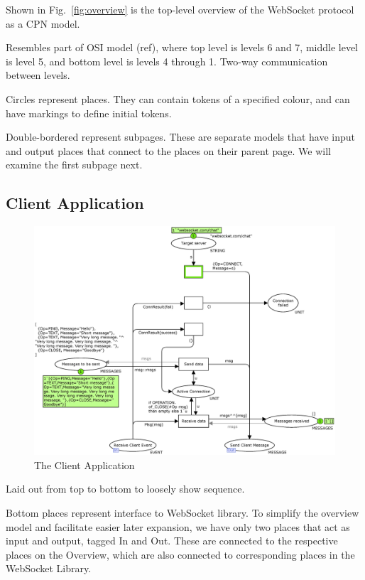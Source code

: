 Shown in Fig.~\ref{fig:overview} is the top-level overview of the WebSocket
protocol as a CPN model. 

Resembles part of OSI model (ref), where top level is levels 6 and 7, middle
level is level 5, and bottom level is levels 4 through 1. Two-way communication
between levels.

Circles represent places. They can contain tokens of a specified colour, and
can have markings to define initial tokens.

Double-bordered represent subpages. These are separate models that have
input and output places that connect to the places on their parent page. We will
examine the first subpage next.

\subsection{Client Application}

\begin{figure}
\centering
\includegraphics[scale=0.4]{figures/ClientApplication.eps}
\caption{The Client Application}
\label{fig:client_app}
\end{figure}

Laid out from top to bottom to loosely show sequence. 

Bottom places represent interface to WebSocket library. To simplify the overview
model and facilitate easier later expansion, we have only two places that act as
input and output, tagged In and Out. These are connected to the
respective places on the Overview, which are also connected to corresponding places in the
WebSocket Library.

